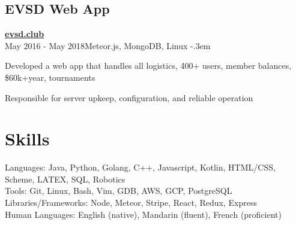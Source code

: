 \documentclass{article}
\let\olditemize=\itemize \let\endolditemize=\enditemize
\renewenvironment{itemize}{\olditemize[topsep=0em] \itemsep-.3em}{\endolditemize}
\newcommand{\myhref}[1]{\href{https://#1}{#1}}
\newcommand{\entry}[3]{\quad\textbf{#1}\\#2\qquad#3}
\begin{document}
\subsection{EVSD Web App}
\entry{\myhref{evsd.club}}{May 2016 - May 2018}{Meteor.js, MongoDB, Linux}
\begin{itemize}
  \item Developed a web app that handles all logistics, 400+ users, member balances,
    \$60k+year, tournaments
  \item Responsible for server upkeep, configuration, and reliable operation
\end{itemize}


\section{Skills}
Languages:
  Java, Python, Golang, C++, Javascript, Kotlin, HTML/CSS, Scheme, LATEX, SQL, Robotics \\
Tools:
  Git, Linux, Bash, Vim, GDB, AWS, GCP, PostgreSQL \\
Libraries/Frameworks:
  Node, Meteor, Stripe, React, Redux, Express \\
Human Languages:
  English (native), Mandarin (fluent), French (proficient)
\end{document}
